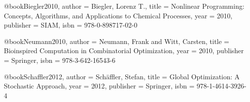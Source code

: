 @book{Biegler2010,
  author = {Biegler, Lorenz T.},
  title = {Nonlinear Programming: Concepts, Algorithms, and Applications to Chemical Processes},
  year = {2010},
  publisher = {SIAM},
  isbn = {978-0-898717-02-0}
}

@book{Neumann2010,
  author = {Neumann, Frank and Witt, Carsten},
  title = {Bioinspired Computation in Combinatorial Optimization},
  year = {2010},
  publisher = {Springer},
  isbn = {978-3-642-16543-6}
}

@book{Schaffler2012,
  author = {Schäffler, Stefan},
  title = {Global Optimization: A Stochastic Approach},
  year = {2012},
  publisher = {Springer},
  isbn = {978-1-4614-3926-4}
} 
